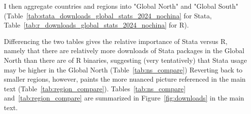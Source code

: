 \documentclass{article}
\begin{document}
I then aggregate countries and regions into "Global North" and "Global South" (Table~\ref{tab:stata_downloads_global_stats_2024_nochina} for Stata, Table~\ref{tab:r_downloads_global_stats_2024_nochina} for R). 
%
%


%
%
Differencing the two tables  gives the relative importance of Stata versus R, namely that there are relatively more downloads of Stata packages in the Global North than there are of R binaries, suggesting (very tentatively) that Stata usage may be higher in the Global North (Table~\ref{tab:ns_compare})
Reverting back to smaller regions, however, paints the more nuanced picture referenced in the main text (Table~\ref{tab:region_compare}). Tables~\ref{tab:ns_compare} and~\ref{tab:region_compare} are summarized in Figure~\ref{fig:downloads} in the main text.



\end{document}
